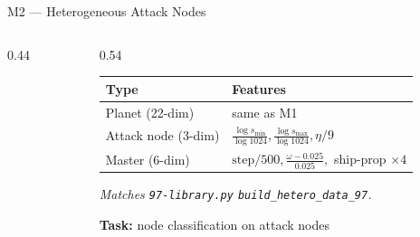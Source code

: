 \documentclass[10pt]{beamer}
\begin{document}
\begin{frame}{M2 — Heterogeneous Attack Nodes}
\begin{columns}[T]

\begin{column}{0.44\textwidth}
\centering
{}
\end{column}

\begin{column}{0.54\textwidth}
\footnotesize
\begin{tabular}{@{}p{1.7cm}p{3.5cm}@{}}
  \toprule
  Type & Features \\
  \midrule
  Planet (22-dim) & same as M1 \\[4pt]
  Attack node \newline (3-dim) &
    $\tfrac{\log s_{\min}}{\log 1024}$,\,$\tfrac{\log s_{\max}}{\log 1024}$,\,$\eta/9$ \\[4pt]
  Master (6-dim) &
    $\mathrm{step}/500$,\,$\tfrac{\omega-0.025}{0.025}$,\,
    ship-prop $\times4$ \\
  \bottomrule
\end{tabular}

\vspace{6pt}
\textit{Matches \texttt{97-library.py} \texttt{build\_hetero\_data\_97}.}

\vspace{6pt}
\textbf{Task:} node classification on attack nodes
\end{column}

\end{columns}
\end{frame}
\end{document}
